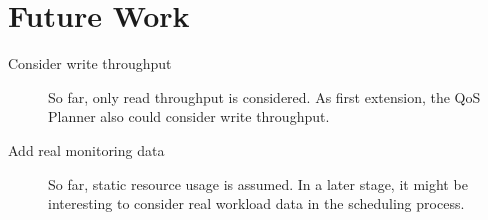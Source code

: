 \documentclass[10pt]{article}
\begin{document}
\section{Future Work}

\begin{description}
 \item[Consider write throughput] So far, only read throughput is considered. As first extension, the QoS Planner also could consider write throughput.
 \item[Add real monitoring data] So far, static resource usage is assumed. In a later stage, it might be interesting to consider real workload data in the scheduling process.
\end{description}
\end{document}
